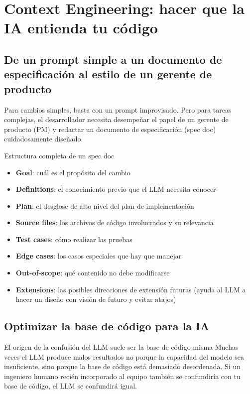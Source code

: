 \documentclass[a4paper]{article}
\begin{document}
\section{Context Engineering: hacer que la IA entienda tu código}

\subsection{De un prompt simple a un documento de especificación al estilo de un gerente de producto}

Para cambios simples, basta con un prompt improvisado. Pero para tareas complejas, el desarrollador necesita desempeñar el papel de un gerente de producto (PM) y redactar un documento de especificación (spec doc) cuidadosamente diseñado.

\begin{importantbox}{Estructura completa de un spec doc}
\begin{itemize}
    \item \textbf{Goal}: cuál es el propósito del cambio
    \item \textbf{Definitions}: el conocimiento previo que el LLM necesita conocer
    \item \textbf{Plan}: el desglose de alto nivel del plan de implementación
    \item \textbf{Source files}: los archivos de código involucrados y su relevancia
    \item \textbf{Test cases}: cómo realizar las pruebas
    \item \textbf{Edge cases}: los casos especiales que hay que manejar
    \item \textbf{Out-of-scope}: qué contenido no debe modificarse
    \item \textbf{Extensions}: las posibles direcciones de extensión futuras (ayuda al LLM a hacer un diseño con visión de futuro y evitar atajos)
\end{itemize}
\end{importantbox}

\subsection{Optimizar la base de código para la IA}

\begin{warningbox}{El origen de la confusión del LLM suele ser la base de código misma}
Muchas veces el LLM produce malos resultados no porque la capacidad del modelo sea insuficiente, sino porque la base de código está demasiado desordenada. Si un ingeniero humano recién incorporado al equipo también se confundiría con tu base de código, el LLM se confundirá igual.
\end{warningbox}
\end{document}
